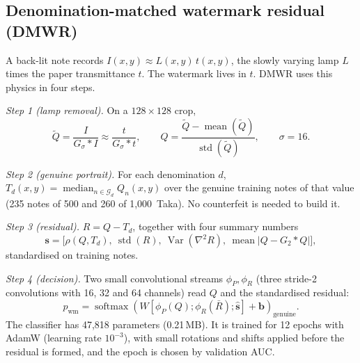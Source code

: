 \documentclass[preprint,12pt]{elsarticle}
\begin{document}
\subsection{Denomination-matched watermark residual (DMWR)}
\label{sec:m_dmwr}
A back-lit note records $I(x,y)\approx L(x,y)\,t(x,y)$, the slowly varying lamp $L$ times the paper transmittance $t$. The watermark lives in $t$. DMWR uses this physics in four steps.

\emph{Step 1 (lamp removal).} On a $128\times128$ crop,
\begin{equation}
\tilde Q=\frac{I}{G_{\sigma}*I}\approx\frac{t}{G_{\sigma}*t},\qquad Q=\frac{\tilde Q-\operatorname{mean}(\tilde Q)}{\operatorname{std}(\tilde Q)},\qquad \sigma=16.
\end{equation}

\emph{Step 2 (genuine portrait).} For each denomination $d$, $T_d(x,y)=\operatorname{median}_{n\in\mathcal G_d}Q_n(x,y)$ over the genuine training notes of that value (235 notes of 500 and 260 of 1,000~Taka). No counterfeit is needed to build it.

\emph{Step 3 (residual).} $R=Q-T_d$, together with four summary numbers
\begin{equation}
\mathbf s=\big[\rho(Q,T_d),\ \operatorname{std}(R),\ \operatorname{Var}(\nabla^2R),\ \operatorname{mean}|Q-G_2*Q|\big],
\end{equation}
standardised on training notes.

\emph{Step 4 (decision).} Two small convolutional streams $\phi_P,\phi_R$ (three stride-2 convolutions with 16, 32 and 64 channels) read $Q$ and the standardised residual:
\begin{equation}
p_{\mathrm{wm}}=\operatorname{softmax}\!\left(W[\phi_P(Q);\phi_R(\bar R);\hat{\mathbf s}]+\mathbf b\right)_{\mathrm{genuine}}.
\end{equation}
The classifier has 47,818 parameters (0.21\,MB). It is trained for 12 epochs with AdamW (learning rate $10^{-3}$), with small rotations and shifts applied before the residual is formed, and the epoch is chosen by validation AUC.
\end{document}
